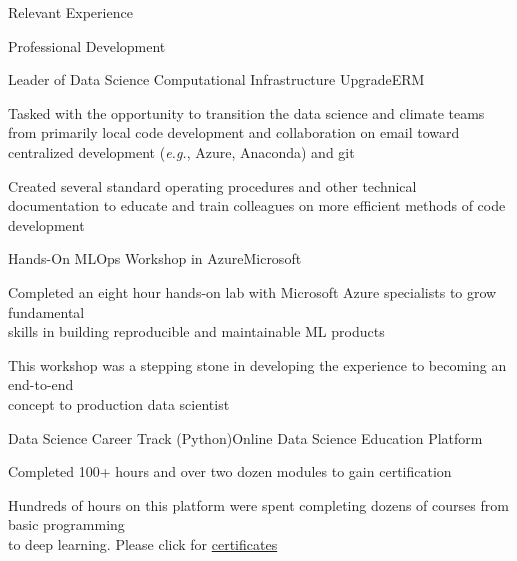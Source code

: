 \documentclass{resume} %
\begin{document}
\begin{rSection}{Relevant Experience}


\end{rSection} 


\begin{rSection}{Professional Development} 
\begin{rSubsection}{Leader of Data Science Computational Infrastructure Upgrade}{}{ERM}{}
\item {Tasked with the opportunity to transition the data science and climate teams from primarily local code development and collaboration on email toward centralized development (\emph{e.g.}, Azure, Anaconda) and git}
\item {Created several standard operating procedures and other technical documentation to educate and train colleagues on more efficient methods of code development}
\end{rSubsection}


\begin{rSubsection}{Hands-On MLOps Workshop in Azure}{}{Microsoft}{}
\item {Completed an eight hour hands-on lab with Microsoft Azure specialists to grow fundamental \\ skills in building reproducible and maintainable ML products}
\item {This workshop was a stepping stone in developing the experience to becoming an end-to-end \\ concept to production data scientist}
\end{rSubsection}


\begin{rSubsection}{Data Science Career Track (Python)}{}{Online Data Science Education Platform}{}
\item {Completed 100+ hours and over two dozen modules to gain certification}
\item {Hundreds of hours on this platform were spent completing dozens of courses from basic programming \\ to deep learning. Please click for \href{https://github.com/907Resident/Certifications}{certificates}}
\end{rSubsection}


\end{rSection}
\end{document}
